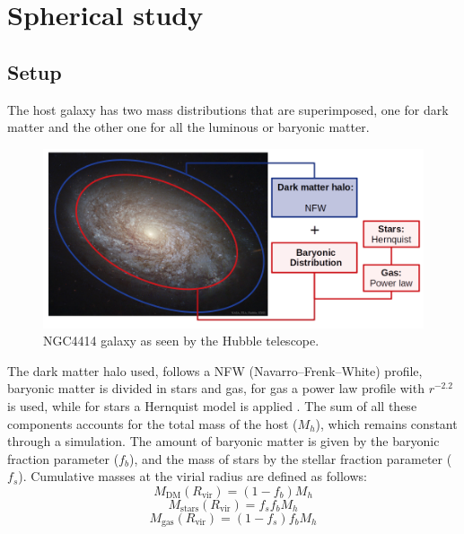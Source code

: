 
%



\chapter{Spherical study}
	\section{Setup}
		The host galaxy has two mass distributions that are superimposed, one for dark matter and the other one for all the luminous or baryonic matter.
		\begin{figure}[h]
			\centering
			\includegraphics[width=0.8\linewidth]{Figures/NGC4414_modified}
			\caption{NGC4414 galaxy as seen by the Hubble telescope.}
		\end{figure}
	
		The dark matter halo used, follows a NFW (Navarro–Frenk–White) profile, baryonic matter is divided in stars and gas, for gas a power law profile with $r^{-2.2}$ is used, while for stars a Hernquist model is applied \cite{tanaka2009assembly, choksi2017recoiling}. The sum of all these components accounts for the total mass of the host ($M_h$), which remains constant through a simulation. The amount of baryonic matter is given by the baryonic fraction parameter ($f_b$), and the mass of stars by the stellar fraction parameter ($f_s$). Cumulative masses at the virial radius are defined as follows:
		\begin{equation}
			M_\text{DM}(R_\text{vir}) = (1 - f_b)M_h
		\end{equation}
		\begin{equation}
			M_\text{stars}(R_\text{vir}) = f_sf_bM_h
		\end{equation}
		\begin{equation}
			M_\text{gas}(R_\text{vir}) = (1 - f_s)f_bM_h
		\end{equation}
		
